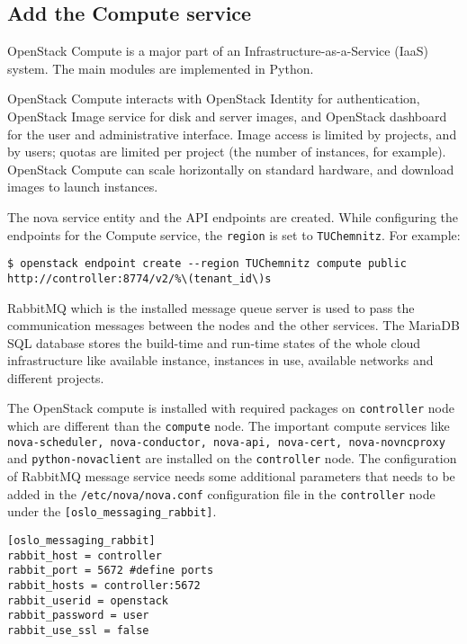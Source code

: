 \subsection{Add the Compute service}\label{ssec:AddtheComputeservice}
OpenStack Compute is a major part of an Infrastructure-as-a-Service (IaaS) system.
The main modules are implemented in Python.

OpenStack Compute interacts with OpenStack Identity for authentication, OpenStack Image service for disk and server images, and OpenStack dashboard for the user and administrative interface. Image access is limited by projects, and by users; quotas are limited per project (the number of instances, for example). OpenStack Compute can scale horizontally on standard hardware, and download images to launch instances.

The nova service entity and the API endpoints are created.
While configuring the endpoints for the Compute service, the \verb|region| is set to \verb|TUChemnitz|.
For example:
\begin{lstlisting}[frame=single]
$ openstack endpoint create --region TUChemnitz compute public http://controller:8774/v2/%\(tenant_id\)s
\end{lstlisting}

RabbitMQ which is the installed message queue server is used to pass the communication messages between the nodes and the other services.
The MariaDB SQL database stores the build-time and run-time states of the whole cloud infrastructure like available instance, instances in use, available networks and different projects.

The OpenStack compute is installed with required packages on \verb|controller| node which are different than the \verb|compute| node.
The important compute services like \texttt{nova-scheduler, nova-conductor, nova-api, nova-cert, nova-novncproxy} and \texttt{python-novaclient} are installed on the \verb|controller| node.
The configuration of RabbitMQ message service needs some additional parameters that needs to be added in the \verb|/etc/nova/nova.conf| configuration file in the \verb|controller| node under the \verb|[oslo_messaging_rabbit]|.

\begin{lstlisting}[frame=single]
[oslo_messaging_rabbit]
rabbit_host = controller
rabbit_port = 5672 #define ports
rabbit_hosts = controller:5672
rabbit_userid = openstack
rabbit_password = user
rabbit_use_ssl = false
\end{lstlisting}

